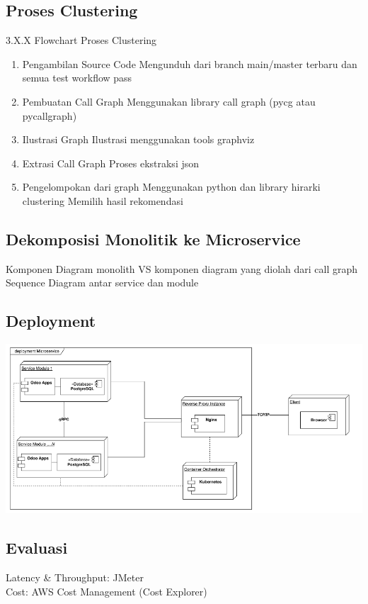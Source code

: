 \subsection{Proses Clustering}
3.X.X Flowchart Proses Clustering
\begin{enumerate}
  \item Pengambilan Source Code
Mengunduh dari branch main/master terbaru dan semua test workflow pass
\item Pembuatan Call Graph
Menggunakan library call graph (pycg atau pycallgraph)
\item Ilustrasi Graph
Ilustrasi menggunakan tools graphviz
\item Extrasi Call Graph
Proses ekstraksi json 
\item Pengelompokan dari graph
Menggunakan python dan library hirarki clustering 
Memilih hasil rekomendasi \\
\end{enumerate}

\subsection{Dekomposisi Monolitik ke Microservice}
Komponen Diagram monolith VS komponen diagram yang diolah dari call graph\\
Sequence Diagram antar service dan module

\subsection{Deployment}
\begin{center}
	\includegraphics[width=14cm]{img/Deployment.png}
	\label{fig:asd}
\end{center}

\subsection{Evaluasi}
Latency \& Throughput:  JMeter\\
Cost: AWS Cost Management (Cost Explorer)
